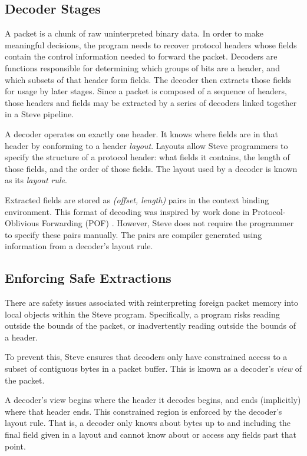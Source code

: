 \subsection{Decoder Stages} \label{decoder_desc}

A packet is a chunk of raw uninterpreted binary data.
In order to make meaningful decisions, the program needs to
recover protocol headers whose fields contain the control
information needed to forward the packet.
Decoders are functions responsible for determining which
groups of bits are a header, and which subsets of that header form fields. 
The decoder then extracts those fields for usage by later stages.
Since a packet is composed of a sequence of headers, those headers and fields
may be extracted by a series of decoders linked together in a Steve pipeline.

A decoder operates on exactly one header.
It knows where fields are in that header by conforming to a header \emph{layout}.
Layouts allow Steve programmers to specify the structure of a
protocol header: what fields it contains, the length of those
fields, and the order of those fields.
The layout used by a decoder is known as its \emph{layout rule}.

Extracted fields are stored as \emph{(offset, length)} pairs in
the context binding environment. 
This format of decoding was inspired by work done in Protocol-Oblivious Forwarding 
(POF) \cite{pof, pof_fis, pof_impl}.
However, Steve does not require the programmer to specify these pairs manually.
The pairs are compiler generated using information from a
decoder's layout rule.

\subsection{Enforcing Safe Extractions}

There are safety issues associated with reinterpreting foreign packet memory
into local objects within the Steve program. Specifically, a program risks
reading outside the bounds of the packet, or inadvertently reading outside
the bounds of a header.

To prevent this,
Steve ensures that decoders only have constrained
access to a subset of contiguous bytes in a packet buffer.
This is known as a decoder's \emph{view} of the packet.

A decoder's view begins where the header it decodes begins, and ends
(implicitly) where that header ends. 
This constrained region is enforced by the decoder's layout rule. 
That is, a decoder only knows about bytes up to and including the final field given in a layout and cannot know about or access any fields past that point.

